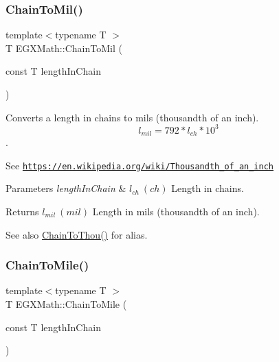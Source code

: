\subsubsection{\texorpdfstring{Chain\+To\+Mil()}{ChainToMil()}}
{\footnotesize\ttfamily template$<$typename T $>$ \\
T E\+G\+X\+Math\+::\+Chain\+To\+Mil (\begin{DoxyParamCaption}\item[{const T}]{length\+In\+Chain }\end{DoxyParamCaption})}



Converts a length in chains to mils (thousandth of an inch). \[ l_{mil}=792 * l_{ch} * 10^{3} \]. 

See \href{https://en.wikipedia.org/wiki/Thousandth_of_an_inch}{\tt https\+://en.\+wikipedia.\+org/wiki/\+Thousandth\+\_\+of\+\_\+an\+\_\+inch} 
\begin{DoxyParams}{Parameters}
{\em length\+In\+Chain} & $ l_{ch}\ (ch)$ Length in chains. \\
\hline
\end{DoxyParams}
\begin{DoxyReturn}{Returns}
$ l_{mil}\ (mil)$ Length in mils (thousandth of an inch). 
\end{DoxyReturn}
\begin{DoxySeeAlso}{See also}
\mbox{\hyperlink{group___e_g_x_math-_conversions-_length_conversions-_surveyors-_chain-_imperial_ga64cd46f80e3af5d7ca664456080ef6a3}{Chain\+To\+Thou()}} for alias. 
\end{DoxySeeAlso}
\mbox{\label{group___e_g_x_math-_conversions-_length_conversions-_surveyors-_chain-_imperial_ga260b1e534400c8ee9ec5001641b2a451}} 
\subsubsection{\texorpdfstring{Chain\+To\+Mile()}{ChainToMile()}}
{\footnotesize\ttfamily template$<$typename T $>$ \\
T E\+G\+X\+Math\+::\+Chain\+To\+Mile (\begin{DoxyParamCaption}\item[{const T}]{length\+In\+Chain }\end{DoxyParamCaption})}



